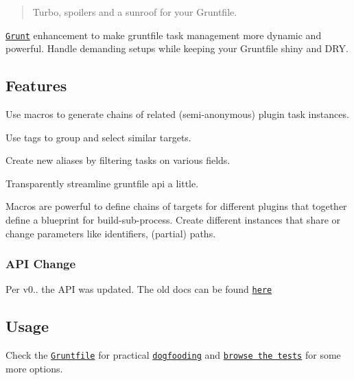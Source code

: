 \href{http://travis-ci.org/Bartvds/gruntfile-gtx}{\tt } \href{https://gemnasium.com/Bartvds/gruntfile-gtx}{\tt } \href{http://badge.fury.io/js/gruntfile-gtx}{\tt }

\begin{quote}
Turbo, spoilers and a sunroof for your Gruntfile. \end{quote}


\href{http://www.gruntjs.com}{\tt Grunt} enhancement to make gruntfile task management more dynamic and powerful. Handle demanding setups while keeping your Gruntfile shiny and D\+RY.

\subsection*{Features}


\begin{DoxyItemize}
\item Use macros to generate chains of related (semi-\/anonymous) plugin task instances.
\item Use tags to group and select similar targets.
\item Create new aliases by filtering tasks on various fields.
\item Transparently streamline gruntfile api a little.
\end{DoxyItemize}

Macros are powerful to define chains of targets for different plugins that together define a blueprint for build-\/sub-\/process. Create different instances that share or change parameters like identifiers, (partial) paths.

\subsubsection*{A\+PI Change}

Per {\ttfamily v0..} the A\+PI was updated. The old docs can be found \href{https://github.com/Bartvds/gruntfile-gtx/commit/3472afa6546980e2a00933023c357dd516fcba2c}{\tt here}

\subsection*{Usage}

Check the \href{https://github.com/Bartvds/gruntfile-gtx/blob/master/Gruntfile.js}{\tt Gruntfile} for practical \href{https://en.wikipedia.org/wiki/Dogfooding}{\tt dogfooding} and \href{https://github.com/Bartvds/gruntfile-gtx/tree/master/test/spec}{\tt browse the tests} for some more options.

